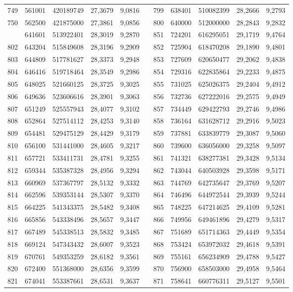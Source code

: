 \begin{longtable}{rrrrrrrrrrr}
749&561001&420189749&27,3679&9,0816&&799&638401&510082399&28,2666&9,2793\\
750&562500&421875000&27,3861&9,0856&&800&640000&512000000&28,2843&9,2832\\
\newpage
801&641601&513922401&28,3019&9,2870&&851&724201&616295051&29,1719&9,4764\\
802&643204&515849608&28,3196&9,2909&&852&725904&618470208&29,1890&9,4801\\
803&644809&517781627&28,3373&9,2948&&853&727609&620650477&29,2062&9,4838\\
804&646416&519718464&28,3549&9,2986&&854&729316&622835864&29,2233&9,4875\\
805&648025&521660125&28,3725&9,3025&&855&731025&625026375&29,2404&9,4912\\
806&649636&523606616&28,3901&9,3063&&856&732736&627222016&29,2575&9,4949\\
807&651249&525557943&28,4077&9,3102&&857&734449&629422793&29,2746&9,4986\\
808&652864&527514112&28,4253&9,3140&&858&736164&631628712&29,2916&9,5023\\
809&654481&529475129&28,4429&9,3179&&859&737881&633839779&29,3087&9,5060\\
810&656100&531441000&28,4605&9,3217&&860&739600&636056000&29,3258&9,5097\\
811&657721&533411731&28,4781&9,3255&&861&741321&638277381&29,3428&9,5134\\
812&659344&535387328&28,4956&9,3294&&862&743044&640503928&29,3598&9,5171\\
813&660969&537367797&28,5132&9,3332&&863&744769&642735647&29,3769&9,5207\\
814&662596&539353144&28,5307&9,3370&&864&746496&644972544&29,3939&9,5244\\
815&664225&541343375&28,5482&9,3408&&865&748225&647214625&29,4109&9,5281\\
816&665856&543338496&28,5657&9,3447&&866&749956&649461896&29,4279&9,5317\\
817&667489&545338513&28,5832&9,3485&&867&751689&651714363&29,4449&9,5354\\
818&669124&547343432&28,6007&9,3523&&868&753424&653972032&29,4618&9,5391\\
819&670761&549353259&28,6182&9,3561&&869&755161&656234909&29,4788&9,5427\\
820&672400&551368000&28,6356&9,3599&&870&756900&658503000&29,4958&9,5464\\
821&674041&553387661&28,6531&9,3637&&871&758641&660776311&29,5127&9,5501\\

\end{longtable}
